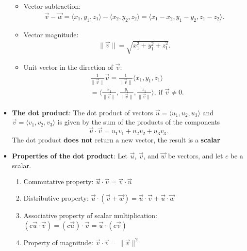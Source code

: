 \documentclass{report}
\begin{document}
\begin{itemize}
\begin{itemize}
            \item Vector subtraction: 
                \begin{align*}
                    \vec{v} - \vec{w} = \langle x_1, y_1, z_1 \rangle - \langle x_2, y_2, z_2 \rangle = \langle x_1 - x_2, y_1 - y_2, z_1 - z_2 \rangle
                .\end{align*}
            \item Vector magnitude: 
                \begin{align*}
                    \|\vec{v}\| = \sqrt{x_1^2 + y_1^2 + z_1^2}
                .\end{align*}
            \item Unit vector in the direction of $\vec{v}$:
                \begin{align*}
                    &\frac{1}{\|\vec{v}\|}\vec{v} = \frac{1}{\|\vec{v}\|}\langle x_1, y_1, z_1 \rangle  \\
                    &= \bigg\langle \frac{x_1}{\|\vec{v}\|}, \frac{y_1}{\|\vec{v}\|}, \frac{z_1}{\|\vec{v}\|} \bigg\rangle,\ \text{if } \vec{v} \neq 0
                .\end{align*}
            \end{itemize}
            \item \textbf{The dot product}:
                The dot product of vectors $\vec{u} = \langle u_1, u_2, u_3 \rangle$ and $\vec{v} = \langle v_1, v_2, v_3 \rangle$ is given by the sum of the products of the components
                \[
                    \vec{u} \cdot \vec{v} = u_1v_1 + u_2v_2 + u_3v_3.
                \]
                The dot product \textbf{does not} return a new vector, the result is a \textbf{scalar}
            \item \textbf{Properties of the dot product}:
                Let $\vec{u}$, $\vec{v}$, and $\vec{w}$ be vectors, and let $c$ be a scalar.
                \begin{enumerate}
                    \item Commutative property: $\vec{u} \cdot \vec{v} = \vec{v} \cdot \vec{u}$
                    \item Distributive property: $\vec{u} \cdot (\vec{v} + \vec{w}) = \vec{u} \cdot \vec{v} + \vec{u} \cdot \vec{w}$
                    \item Associative property of scalar multiplication: $(c\vec{u} \cdot \vec{v}) = (c\vec{u}) \cdot \vec{v} = \vec{u} \cdot (c\vec{v})$
                    \item Property of magnitude: $\vec{v} \cdot \vec{v} = \|\vec{v}\|^2$

\end{enumerate}
\end{itemize}
\end{document}
